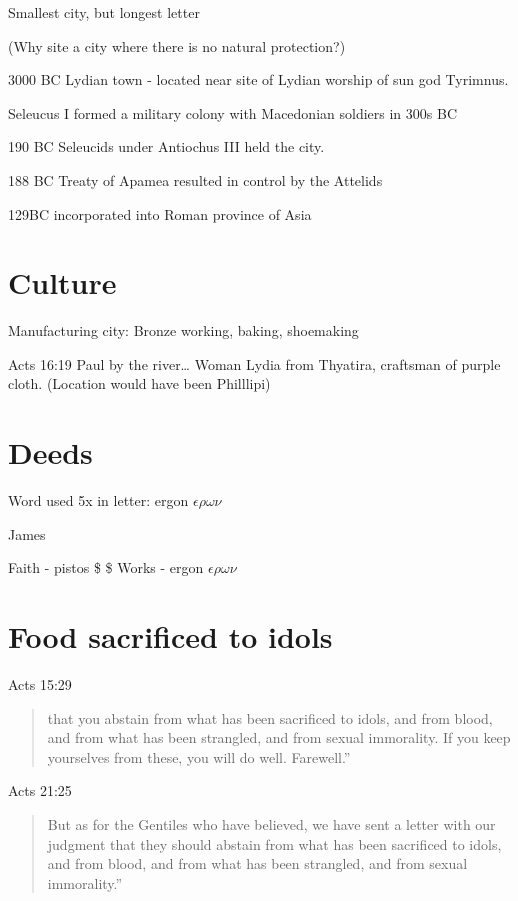 \documentclass[
]{book}
\begin{document}
Smallest city, but longest letter

(Why site a city where there is no natural protection?)

3000 BC Lydian town - located near site of Lydian worship of sun god Tyrimnus.

Seleucus I formed a military colony with Macedonian soldiers in 300s BC

190 BC Seleucids under Antiochus III held the city.

188 BC Treaty of Apamea resulted in control by the Attelids

129BC incorporated into Roman province of Asia

\hypertarget{culture-2}{%
\section{Culture}\label{culture-2}}

Manufacturing city: Bronze working, baking, shoemaking

Acts 16:19 Paul by the river\ldots{} Woman Lydia from Thyatira, craftsman of purple cloth. (Location would have been Philllipi)

\hypertarget{deeds}{%
\section{Deeds}\label{deeds}}

Word used 5x in letter: ergon \(\epsilon \rho \omega \nu\)

James

Faith - pistos \$ \pi \iota \sigma \tau \omega \sigma \$
Works - ergon \(\epsilon \rho \omega \nu\)

\hypertarget{food-sacrificed-to-idols}{%
\section{Food sacrificed to idols}\label{food-sacrificed-to-idols}}

Acts 15:29

\begin{quote}
that you abstain from what has been sacrificed to idols, and from blood, and from what has been strangled, and from sexual immorality. If you keep yourselves from these, you will do well. Farewell.''
\end{quote}

Acts 21:25

\begin{quote}
But as for the Gentiles who have believed, we have sent a letter with our judgment that they should abstain from what has been sacrificed to idols, and from blood, and from what has been strangled, and from sexual immorality.''
\end{quote}
\end{document}
